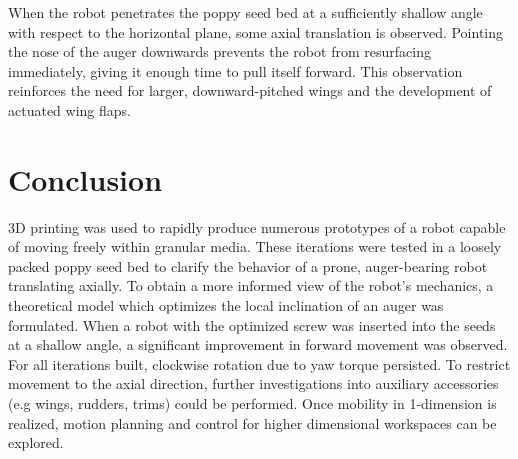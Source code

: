 \documentclass[letterpaper, 11 pt]{article}
\begin{document}
When the robot penetrates the poppy seed bed at a sufficiently shallow angle with respect to the horizontal plane, some axial translation is observed. Pointing the nose of the auger downwards prevents the robot from resurfacing immediately, giving it enough time to pull itself forward. This observation reinforces the need for larger, downward-pitched wings and the development of actuated wing flaps.   

\section{Conclusion}
3D printing was used to rapidly produce numerous prototypes of a robot capable of moving freely within granular media. These iterations were tested in a loosely packed poppy seed bed to clarify the behavior of a prone, auger-bearing robot translating axially. To obtain a more informed view of the robot's mechanics, a theoretical model  which optimizes the local inclination of an auger was formulated. When a robot with the optimized screw was inserted into the seeds at a shallow angle, a significant improvement in forward movement was observed. For all iterations built, clockwise rotation due to yaw torque persisted. To restrict movement to the axial direction, further investigations into auxiliary accessories (e.g wings, rudders, trims) could be performed. Once mobility in 1-dimension is realized, motion planning and control for higher dimensional workspaces can be explored.      



\end{document}
